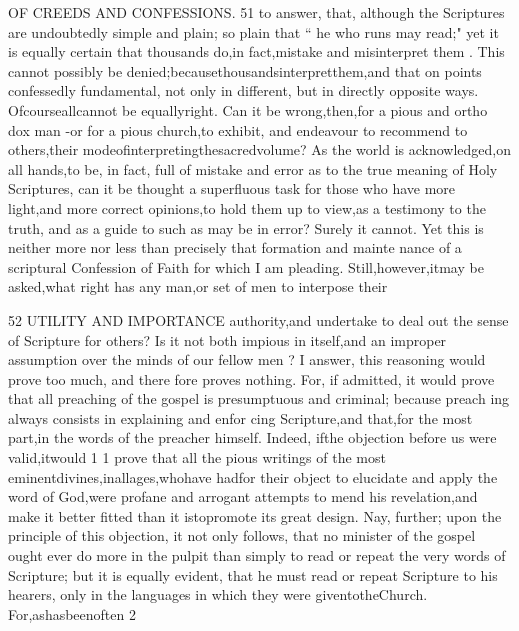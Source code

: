 \documentclass[
]{book}
\begin{document}
OF CREEDS AND CONFESSIONS. 51
to answer, that, although the Scriptures are undoubtedly simple and plain; so plain that
`` he who runs may read;" yet it is equally certain that thousands do,in fact,mistake and misinterpret them . This cannot possibly be denied;becausethousandsinterpretthem,and that on points confessedly fundamental, not only in different, but in directly opposite ways. Ofcourseallcannot be equallyright. Can it be wrong,then,for a pious and ortho dox man -or for a pious church,to exhibit, and endeavour to recommend to others,their modeofinterpretingthesacredvolume? As the world is acknowledged,on all hands,to be, in fact, full of mistake and error as to the true meaning of Holy Scriptures, can it be thought a superfluous task for those who have
more light,and more correct opinions,to hold them up to view,as a testimony to the truth, and as a guide to such as may be in error? Surely it cannot. Yet this is neither more nor less than precisely that formation and mainte nance of a scriptural Confession of Faith for which I am pleading.
Still,however,itmay be asked,what right has any man,or set of men to interpose their

52 UTILITY AND IMPORTANCE
authority,and undertake to deal out the sense of Scripture for others? Is it not both impious
in itself,and an improper assumption over the minds of our fellow men ? I answer, this reasoning would prove too much, and there fore proves nothing. For, if admitted, it would prove that all preaching of the gospel
is presumptuous and criminal; because preach ing always consists in explaining and enfor cing Scripture,and that,for the most part,in the words of the preacher himself. Indeed, ifthe objection before us were valid,itwould
1 1
prove that all the pious writings of the most eminentdivines,inallages,whohave hadfor
their object to elucidate and apply the word of God,were profane and arrogant attempts to
mend his revelation,and make it better fitted than it istopromote its great design. Nay,
further; upon the principle of this objection, it not only follows, that no minister of the
gospel ought ever do more in the pulpit than simply to read or repeat the very words of Scripture; but it is equally evident, that he must read or repeat Scripture to his hearers, only in the languages in which they were giventotheChurch. For,ashasbeenoften
2
\end{document}
